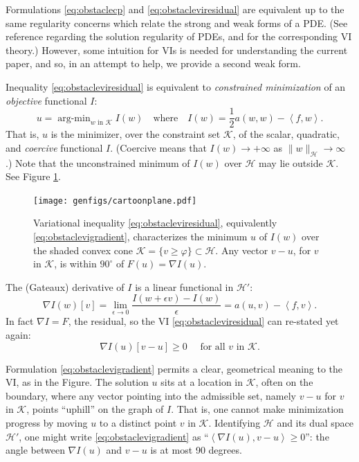 \documentclass[letterpaper,final,12pt,reqno]{amsart}
\theoremstyle{claim}
\newcommand{\eps}{\epsilon}
\newcommand{\grad}{\nabla}
\newcommand{\ip}[2]{\left<#1,#2\right>}
\numberwithin{equation}{section}
\numberwithin{figure}{section}
\numberwithin{table}{section}
\numberwithin{theorem}{section}
\begin{document}
Formulations \eqref{eq:obstaclecp} and \eqref{eq:obstacleviresidual} are equivalent up to the same regularity concerns which relate the strong and weak forms of a PDE.  (See reference \cite{Evans2010} regarding the solution regularity of PDEs, and \cite{KinderlehrerStampacchia1980} for the corresponding VI theory.)  However, some intuition for VIs is needed for understanding the current paper, and so, in an attempt to help, we provide a second weak form.

Inequality \eqref{eq:obstacleviresidual} is equivalent to \emph{constrained minimization} of an \emph{objective} functional $I$:
\newcommand{\argmin}{\mathop{\mathrm{arg\text{-}min}}}
\begin{equation}
  u = \argmin_{w \text{ in } \mathcal{K}} I(w) \quad \text{where} \quad I(w) = \frac{1}{2} a(w,w) - \ip{f}{w}. \label{eq:obstaclemin}
\end{equation}
That is, $u$ is the minimizer, over the constraint set $\mathcal{K}$, of the scalar, quadratic, and \emph{coercive} functional $I$.  (Coercive means that $I(w) \to +\infty$ as $\|w\|_{\mathcal{H}} \to \infty$ \cite{Evans2010}.)  Note that the unconstrained minimum of $I(w)$ over $\mathcal{H}$ may lie outside $\mathcal{K}$.  See Figure \ref{fig:cartoonplane}.

\begin{figure}
\texttt{[image: genfigs/cartoonplane.pdf]}
\caption{Variational inequality \eqref{eq:obstacleviresidual}, equivalently \eqref{eq:obstaclevigradient}, characterizes the minimum $u$ of $I(w)$ over the shaded convex cone $\mathcal{K}=\{v\ge \varphi\} \subset \mathcal{H}$.  Any vector $v-u$, for $v$ in $\mathcal{K}$, is within $90^\circ$ of $F(u) = \grad I(u)$.}
\label{fig:cartoonplane}
\end{figure}

The (Gateaux) derivative of $I$ is a linear functional in $\mathcal{H}'$:
\begin{equation}
  \grad I(w)[v] = \lim_{\eps\to 0} \frac{I(w+\eps v) - I(w)}{\eps} = a(u,v) - \ip{f}{v}.  \label{eq:gradobjective}
\end{equation}
In fact $\nabla I = F$, the residual, so the VI \eqref{eq:obstacleviresidual} can re-stated yet again:
\begin{equation}
  \nabla I(u)[v-u] \ge 0 \quad \text{ for all } v \text{ in } \mathcal{K}. \label{eq:obstaclevigradient}
\end{equation}

Formulation \eqref{eq:obstaclevigradient} permits a clear, geometrical meaning to the VI, as in the Figure.  The solution $u$ sits at a location in $\mathcal{K}$, often on the boundary, where any vector pointing into the admissible set, namely $v-u$ for $v$ in $\mathcal{K}$, points ``uphill'' on the graph of $I$.  That is, one cannot make minimization progress by moving $u$ to a distinct point $v$ in $\mathcal{K}$.  Identifying $\mathcal{H}$ and its dual space $\mathcal{H}'$, one might write \eqref{eq:obstaclevigradient} as ``$\ip{\nabla I(u)}{v-u} \ge 0$'': the angle between $\nabla I(u)$ and $v-u$ is at most 90 degrees.
\end{document}
